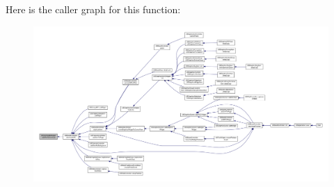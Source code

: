 Here is the caller graph for this function\-:
\nopagebreak
\begin{figure}[H]
\begin{center}
\leavevmode
\includegraphics[width=350pt]{d7/d38/class_u_b_download_manager_a1256f03bf7e614a35236fcd55ebdbdb6_icgraph}
\end{center}
\end{figure}


